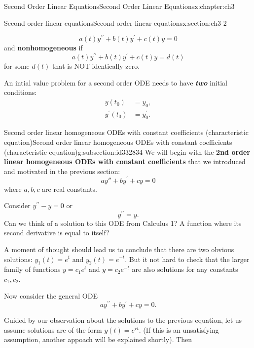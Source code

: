 \documentclass[oneside,10pt,]{book}
\newcommand{\alert}[1]{\textbf{\textit{#1}}}
\newcommand{\terminology}[1]{\textbf{#1}}
\numberwithin{equation}{section}
\numberwithin{equation}{section}
\newcommand{\amp}{&}
\begin{document}
\begin{chapterptx}{Second Order Linear Equations}{}{Second Order Linear Equations}{}{}{x:chapter:ch3}
\begin{sectionptx}{Second order linear equations}{}{Second order linear equations}{}{}{x:section:ch3-2}
\begin{introduction}{}
\begin{equation*}
a(t)y^{\prime\prime}+b(t)y^{\prime}+c(t)y=0
\end{equation*}
and \terminology{nonhomogeneous} if%
\begin{equation*}
a(t)y^{\prime\prime}+b(t)y^{\prime}+c(t)y=d(t)
\end{equation*}
for some \(d(t)\) that is NOT identically zero.%
\par
An intial value problem for a second order ODE needs to have \alert{two} initial conditions:%
\begin{align*}
y(t_{0}) \amp =y_{0},\\
y^{\prime}(t_{0}) \amp =y_{0}^{\prime}.
\end{align*}
%
\end{introduction}%
%
%
\typeout{************************************************}
\typeout{************************************************}
%
\begin{subsectionptx}{Second order linear homogeneous ODEs with constant coefficients (characteristic equation)}{}{Second order linear homogeneous ODEs with constant coefficients (characteristic equation)}{}{}{g:subsection:id332834}
We will begin with the \terminology{2nd order linear homogeneous ODEs with constant coefficients} that we introduced and motivated in the previous section:%
\begin{equation*}
ay''+by^{\prime}+cy=0
\end{equation*}
where \(a,b,c\) are real constants.%
\par
Consider \(y^{\prime\prime}-y=0\) or%
\begin{equation*}
y^{\prime\prime}=y.
\end{equation*}
Can we think of a solution to this ODE from Calculus 1? A function where its second derivative is equal to itself?%
\par
A moment of thought should lead us to conclude that there are two obvious solutions: \(y_{1}(t)=e^{t}\) and \(y_{2}(t)=e^{-t}\). But it not hard to check that the larger family of functions \(y = c_{1}e^{t}\) and \(y = c_{2}e^{-t}\) are also solutions for any constants \(c_1, c_2\).%
\par
Now consider the general ODE%
\begin{equation*}
ay^{\prime\prime}+by^{\prime}+cy=0.
\end{equation*}
%
\par
Guided by our observation about the solutions to the previous equation, let us assume solutions are of the form \(y(t)=e^{rt}\). (If this is an unsatisfying assumption, another appoach will be explained shortly).  Then%

\end{subsectionptx}
\end{sectionptx}
\end{chapterptx}
\end{document}
